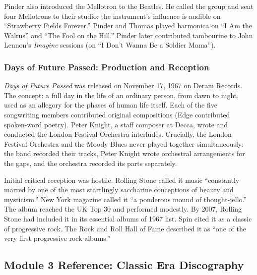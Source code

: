 \documentclass[11pt,letterpaper]{article}
\begin{document}
Pinder also introduced the Mellotron to the Beatles. He called the group and sent four Mellotrons to their studio; the instrument's influence is audible on ``Strawberry Fields Forever.'' Pinder and Thomas played harmonica on ``I Am the Walrus'' and ``The Fool on the Hill.'' Pinder later contributed tambourine to John Lennon's \textit{Imagine} sessions (on ``I Don't Wanna Be a Soldier Mama'').

\subsubsection{Days of Future Passed: Production and Reception}

\textit{Days of Future Passed} was released on November 17, 1967 on Deram Records. The concept: a full day in the life of an ordinary person, from dawn to night, used as an allegory for the phases of human life itself. Each of the five songwriting members contributed original compositions (Edge contributed spoken-word poetry). Peter Knight, a staff composer at Decca, wrote and conducted the London Festival Orchestra interludes. Crucially, the London Festival Orchestra and the Moody Blues never played together simultaneously: the band recorded their tracks, Peter Knight wrote orchestral arrangements for the gaps, and the orchestra recorded its parts separately.

Initial critical reception was hostile. Rolling Stone called it music ``constantly marred by one of the most startlingly saccharine conceptions of beauty and mysticism.'' New York magazine called it ``a ponderous mound of thought-jello.'' The album reached the UK Top 30 and performed modestly. By 2007, Rolling Stone had included it in its essential albums of 1967 list. Spin cited it as a classic of progressive rock. The Rock and Roll Hall of Fame described it as ``one of the very first progressive rock albums.''

\subsection{Module 3 Reference: Classic Era Discography}
\end{document}
